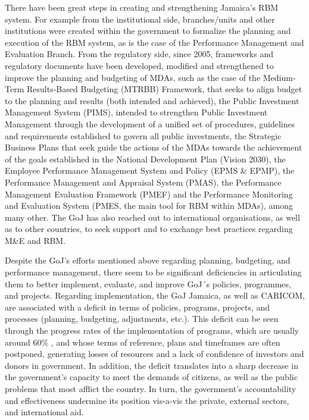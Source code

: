\documentclass[
  10pt,
]{book}
\begin{document}
There have been great steps in creating and strengthening Jamaica's RBM system. For example from the institutional side, branches/units and other institutions were created within the government to formalize the planning and execution of the RBM system, as is the case of the Performance Management and Evaluation Branch. From the regulatory side, since 2005, frameworks and regulatory documents have been developed, modified and strengthened to improve the planning and budgeting of MDAs, such as the case of the Medium-Term Results-Based Budgeting (MTRBB) Framework, that seeks to align budget to the planning and results (both intended and achieved), the Public Investment Management System (PIMS), intended to strengthen Public Investment Management through the development of a unified set of procedures, guidelines and requirements established to govern all public investments, the Strategic Business Plans that seek guide the actions of the MDAs towards the achievement of the goals established in the National Development Plan (Vision 2030), the Employee Performance Management System and Policy (EPMS \& EPMP), the Performance Management and Appraisal System (PMAS), the Performance Management Evaluation Framework (PMEF) and the Performance Monitoring and Evaluation System (PMES, the main tool for RBM within MDAs), among many other. The GoJ has also reached out to international organisations, as well as to other countries, to seek support and to exchange best practices regarding M\&E and RBM.

Despite the GoJ's efforts mentioned above regarding planning, budgeting, and performance management, there seem to be significant deficiencies in articulating them to better implement, evaluate, and improve GoJ´s policies, programmes, and projects. Regarding implementation, the GoJ Jamaica, as well as CARICOM, are associated with a deficit in terms of policies, programs, projects, and processes (planning, budgeting, adjustments, etc.). This deficit can be seen through the progress rates of the implementation of programs, which are usually around 60\% , and whose terms of reference, plans and timeframes are often postponed, generating losses of resources and a lack of confidence of investors and donors in government. In addition, the deficit translates into a sharp decrease in the government's capacity to meet the demands of citizens, as well as the public problems that most afflict the country. In turn, the government's accountability and effectiveness undermine its position vis-a-vis the private, external sectors, and international aid.
\end{document}
